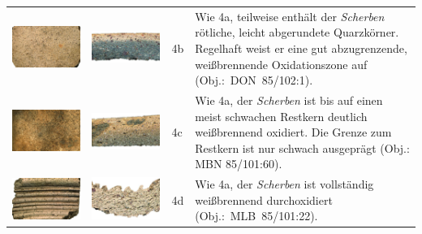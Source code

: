 \begin{footnotesize}
{\begin{longtable}{@{}m{}m{}m{}m{}@{}}
\includegraphics[width=.3\textwidth]{tbl/Tab_Fabrics/DON85-102-1_5cm.jpg} & \includegraphics[width=.3\textwidth]{tbl/Tab_Fabrics/DON85-102-1_2cm.jpg} & 4b & Wie 4a, teilweise enthält der \textit{Scherben} rötliche, leicht abgerundete Quarzkörner. Regelhaft weist er eine gut abzugrenzende, weißbrennende Oxidationszone auf (Obj.:~DON~85/102:1).\vspace{1em} \\
\includegraphics[width=.3\textwidth]{tbl/Tab_Fabrics/MBN85-101-60_5cm.jpg} & \includegraphics[width=.3\textwidth]{tbl/Tab_Fabrics/MBN85-101-60_2cm.jpg} & 4c & Wie 4a, der \textit{Scherben} ist bis auf einen meist schwachen Restkern deutlich weißbrennend oxidiert. Die Grenze zum Restkern ist nur schwach ausgeprägt (Obj.: MBN 85/101:60). \\
\includegraphics[width=.3\textwidth]{tbl/Tab_Fabrics/MLB85-101-22_5cm.jpg} & \includegraphics[width=.3\textwidth]{tbl/Tab_Fabrics/MLB85-101-22_2cm.jpg} & 4d & Wie 4a, der \textit{Scherben} ist vollständig weißbrennend durchoxidiert (Obj.:~MLB~85/101:22). \\

\end{longtable}}
\end{footnotesize}
